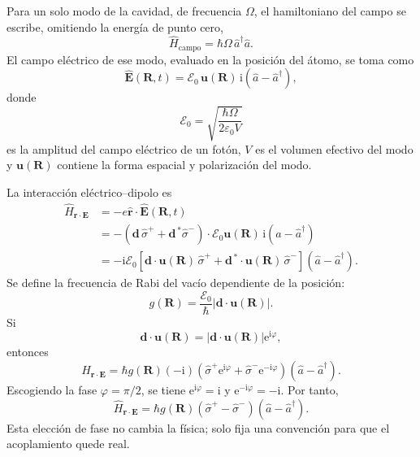 \documentclass[11pt]{article}
\newcommand{\ii}{\mathrm{i}}
\newcommand{\ee}{\mathrm{e}}
\newcommand{\vb}[1]{\mathbf{#1}}
\newcommand{\Ezero}{\mathcal E_0}
\newcommand{\adag}{\hat a^\dagger}
\newcommand{\splus}{\hat\sigma^+}
\newcommand{\sminus}{\hat\sigma^-}
\begin{document}
Para un solo modo de la cavidad, de frecuencia \(\Omega\), el hamiltoniano del
campo se escribe, omitiendo la energ\'ia de punto cero,
\begin{equation}
  \hat H_{\mathrm{campo}}
  =
  \hbar\Omega\,\adag\hat a.
\end{equation}
El campo el\'ectrico de ese modo, evaluado en la posici\'on del \'atomo, se toma
como
\begin{equation}
  \hat{\vb E}(\vb R,t)
  =
  \Ezero\,\vb u(\vb R)\,\ii(\hat a-\adag),
\end{equation}
donde
\begin{equation}
  \Ezero
  =
  \sqrt{\frac{\hbar\Omega}{2\varepsilon_0V}}
\end{equation}
es la amplitud del campo el\'ectrico de un fot\'on, \(V\) es el volumen efectivo
del modo y \(\vb u(\vb R)\) contiene la forma espacial y polarizaci\'on del
modo.

La interacci\'on el\'ectrico--dipolo es
\begin{align}
  \hat H_{\vb r\cdot\vb E}
  &=
  -e\hat{\vb r}\cdot\hat{\vb E}(\vb R,t)                                      \\
  &=
  -
  \left(
    \vb d\,\splus+\vb d^{\,*}\sminus
  \right)
  \cdot
  \Ezero\vb u(\vb R)\,\ii(\hat a-\adag)                                      \\
  &=
  -\ii\Ezero
  \left[
    \vb d\cdot\vb u(\vb R)\,\splus
    +
    \vb d^{\,*}\cdot\vb u(\vb R)\,\sminus
  \right]
  (\hat a-\adag).
\end{align}
Se define la frecuencia de Rabi del vac\'io dependiente de la posici\'on:
\begin{equation}
  g(\vb R)
  =
  \frac{\Ezero}{\hbar}
  \left|
    \vb d\cdot\vb u(\vb R)
  \right|.
\end{equation}
Si
\begin{equation}
  \vb d\cdot\vb u(\vb R)
  =
  \left|
    \vb d\cdot\vb u(\vb R)
  \right|
  \ee^{\ii\varphi},
\end{equation}
entonces
\begin{equation}
  \hat H_{\vb r\cdot\vb E}
  =
  \hbar g(\vb R)(-\ii)
  \left(
    \splus\ee^{\ii\varphi}
    +
    \sminus\ee^{-\ii\varphi}
  \right)
  (\hat a-\adag).
\end{equation}
Escogiendo la fase \(\varphi=\pi/2\), se tiene
\(\ee^{\ii\varphi}=\ii\) y \(\ee^{-\ii\varphi}=-\ii\). Por tanto,
\begin{equation}
  \hat H_{\vb r\cdot\vb E}
  =
  \hbar g(\vb R)
  (\splus-\sminus)
  (\hat a-\adag).
\end{equation}
Esta elecci\'on de fase no cambia la f\'isica; solo fija una convenci\'on para
que el acoplamiento quede real.
\end{document}
